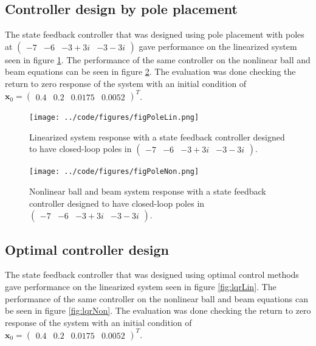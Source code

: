 \documentclass[a4paper, titlepage]{article}
\begin{document}
\subsection{Controller design by pole placement}
The state feedback controller that was designed using pole placement with poles at  $\begin{pmatrix} -7 & -6 & -3+3i & -3-3i \end{pmatrix}$ gave performance on the linearized system seen in figure \ref{fig:poleLin}.
The performance of the same controller on the nonlinear ball and beam equations can be seen in figure \ref{fig:poleNon}.
The evaluation was done checking the return to zero response of the system with an initial condition of $\textbf{x}_0 = \begin{pmatrix} 0.4 & 0.2 & 0.0175 & 0.0052 \end{pmatrix}^T$.

\begin{figure}[H]
\center
\texttt{[image: ../code/figures/figPoleLin.png]}
\caption{Linearized system response with a state feedback controller designed to have closed-loop poles in $\begin{pmatrix} -7 & -6 & -3+3i & -3-3i \end{pmatrix}$.}
\label{fig:poleLin}
\end{figure}

\begin{figure}[H]
\center
\texttt{[image: ../code/figures/figPoleNon.png]}
\caption{Nonlinear ball and beam system response with a state feedback controller designed to have closed-loop poles in $\begin{pmatrix} -7 & -6 & -3+3i & -3-3i \end{pmatrix}$.}
\label{fig:poleNon}
\end{figure}

\subsection{Optimal controller design}
The state feedback controller that was designed using optimal control methods gave performance on the linearized system seen in figure \ref{fig:lqrLin}.
The performance of the same controller on the nonlinear ball and beam equations can be seen in figure \ref{fig:lqrNon}.
The evaluation was done checking the return to zero response of the system with an initial condition of $\textbf{x}_0 = \begin{pmatrix} 0.4 & 0.2 & 0.0175 & 0.0052 \end{pmatrix}^T$.
\end{document}

